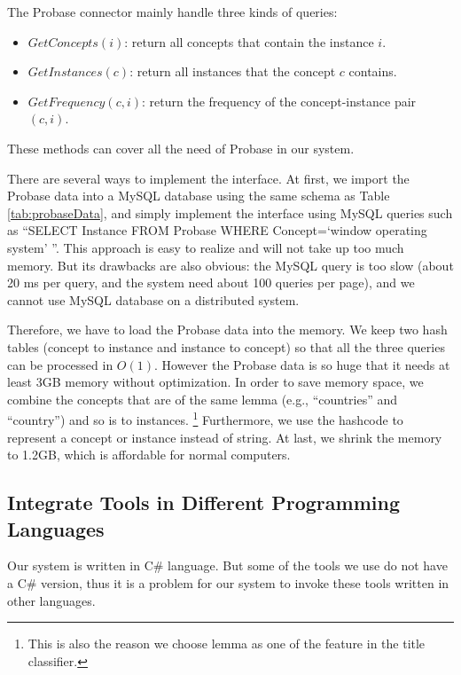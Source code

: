 The Probase connector mainly handle three kinds of queries:

\begin{itemize}
\item \textbf{ $GetConcepts(i)$}:
return all concepts that contain the instance $i$.

\item \textbf{ $GetInstances(c)$}:
return all instances that the concept $c$ contains.

\item \textbf{ $GetFrequency(c,i)$}:
return the frequency of the concept-instance pair $(c,i)$.

\end{itemize}

These methods can cover all the need of Probase in our system.

There are several ways to implement the interface. At first, we import the Probase data into a MySQL database\cite{mysqlWebsite} using the same schema as Table \ref{tab:probaseData},
and simply implement the interface using MySQL queries such as ``SELECT Instance FROM Probase WHERE Concept=`window operating system' ''. This approach is easy to realize and will not take up too much memory. But its drawbacks are also obvious: the MySQL query is too slow (about 20 ms per query, and the system need about 100 queries per page), and we cannot use MySQL database on a distributed system.

Therefore, we have to load the Probase data into the memory. We keep two hash tables (concept to instance and instance to concept) so that all the three queries can be processed in $O(1)$. However the Probase data is so huge that it needs at least 3GB memory without optimization.
In order to save memory space, we combine the concepts that are of the same lemma (e.g., ``countries'' and ``country'') and so is to instances. \footnote{This is also the reason we choose lemma as one of the feature in the title classifier.}
Furthermore, we use the hashcode to represent a concept or instance instead of string. At last, we shrink the memory to 1.2GB, which is affordable for normal computers.

\subsection{Integrate Tools in Different Programming Languages}
Our system is written in C\# language. But some of the tools we use do not have a C\# version, thus it is a problem for our system to invoke these tools written in other languages.

